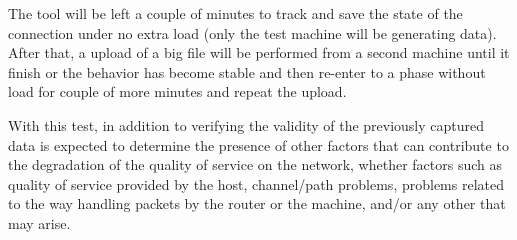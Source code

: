 The tool will be left a couple of minutes to track and save the state of the
connection under no extra load (only the test machine will be generating
data). After that, a upload of a big file will be performed from a second
machine until it finish or the behavior has become stable and then re-enter to
a phase without load for couple of more minutes and repeat the upload.

With this test, in addition to verifying the validity of the previously captured
data is expected to determine the presence of other factors that can contribute
to the degradation of the quality of service on the network, whether factors
such as quality of service provided by the host, channel/path problems, problems
related to the way handling packets by the router or the machine, and/or any
other that may arise.
